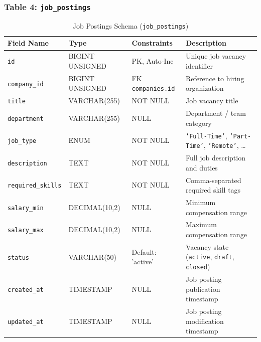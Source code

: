 \subsubsection{Table 4: \texttt{job\_postings}}
\begin{table}[H]
\centering
\small
\caption{Job Postings Schema (\texttt{job\_postings})}
\label{tab:schema_job_postings}
\begin{tabular}{|p{3cm}|p{2.8cm}|p{2.2cm}|p{5.5cm}|}
\hline
\textbf{Field Name} & \textbf{Type} & \textbf{Constraints} & \textbf{Description} \\ \hline
\texttt{id} & BIGINT UNSIGNED & PK, Auto-Inc & Unique job vacancy identifier \\ \hline
\texttt{company\_id} & BIGINT UNSIGNED & FK \texttt{companies.id} & Reference to hiring organization \\ \hline
\texttt{title} & VARCHAR(255) & NOT NULL & Job vacancy title \\ \hline
\texttt{department} & VARCHAR(255) & NULL & Department / team category \\ \hline
\texttt{job\_type} & ENUM & NOT NULL & \texttt{'Full-Time'}, \texttt{'Part-Time'}, \texttt{'Remote'}, \dots \\ \hline
\texttt{description} & TEXT & NOT NULL & Full job description and duties \\ \hline
\texttt{required\_skills}& TEXT & NOT NULL & Comma-separated required skill tags \\ \hline
\texttt{salary\_min} & DECIMAL(10,2) & NULL & Minimum compensation range \\ \hline
\texttt{salary\_max} & DECIMAL(10,2) & NULL & Maximum compensation range \\ \hline
\texttt{status} & VARCHAR(50) & Default: 'active' & Vacancy state (\texttt{active}, \texttt{draft}, \texttt{closed}) \\ \hline
\texttt{created\_at} & TIMESTAMP & NULL & Job posting publication timestamp \\ \hline
\texttt{updated\_at} & TIMESTAMP & NULL & Job posting modification timestamp \\ \hline
\end{tabular}
\end{table}

